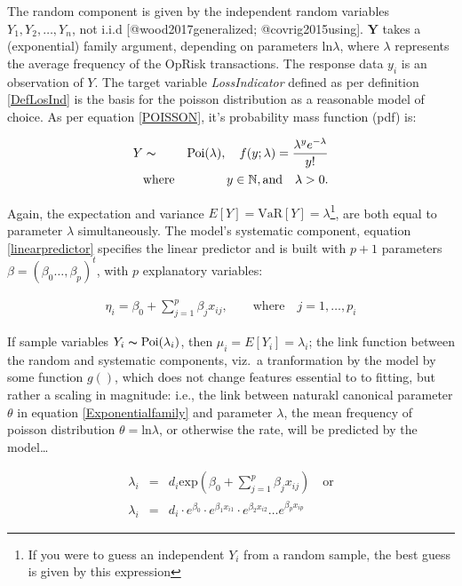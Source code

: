 \documentclass[]{article}
\let\rmarkdownfootnote\footnote%
\def\footnote{\protect\rmarkdownfootnote}
\begin{document}
The random component is given by the independent random variables
\(Y_1, Y_2,\ldots, Y_n\), not i.i.d {[}@wood2017generalized;
@covrig2015using{]}. \(\mathbf{Y}\) takes a (exponential) family
argument, depending on parameters \(\mbox{ln}\lambda\), where
\(\lambda\) represents the average frequency of the OpRisk transactions.
The response data \(y_i\) is an observation of \(Y\). The target
variable \emph{LossIndicator} defined as per definition \ref{DefLosInd}
is the basis for the poisson distribution as a reasonable model of
choice. As per equation \ref{POISSON}, it's probability mass function
(pdf) is:

\singlespacing

\begin{eqnarray}\label{eqn:Poisson}
Y &\thicksim & \mbox{Poi}(\lambda), \quad f(y;\lambda) = \frac{\lambda^y e^{-\lambda}}{y!}\\
 &\mbox{where}& \quad y \in  \mathbb{N}, \mbox{and} \quad \lambda > 0. \nonumber
\end{eqnarray} \doublespacing

Again, the expectation and variance
\(E[Y] = \mbox{VaR}[Y] = \lambda\)\footnote{If you were to guess an independent $Y_i$ from a random sample, the best guess is given by this expression},
are both equal to parameter \(\lambda\) simultaneously. The model's
systematic component, equation \ref{linearpredictor} specifies the
linear predictor and is built with \(p + 1\) parameters
\(\beta = (\beta_0\ldots,\beta_p)^t\), with \(p\) explanatory variables:

\singlespacing

\begin{eqnarray}
\eta_i = \beta_0 + \sum_{j=1}^{p}\beta_jx_{ij}, \qquad \mbox{where} \quad j = 1,\ldots,p_i
\end{eqnarray} \doublespacing

If sample variables \(Y_i \thicksim \mbox{Poi}(\lambda_i)\), then
\(\mu_i = E[Y_i] = \lambda_i\); the link function between the random and
systematic components, viz.~a tranformation by the model by some
function \(g()\), which does not change features essential to to
fitting, but rather a scaling in magnitude: i.e., the link between
naturakl canonical parameter \(\theta\) in equation
\ref{Exponentialfamily} and parameter \(\lambda\), the mean frequency of
poisson distribution \(\theta = \mbox{ln}\lambda\), or otherwise the
rate, will be predicted by the model\ldots

\singlespacing

\begin{eqnarray}\label{eqn:multmodel}
\lambda_i &=& d_i\mbox{exp}(\beta_0 + \sum_{j=1}^{p}\beta_jx_{ij}) \quad \mbox{or} \nonumber \\
\lambda_i &=& d_i\cdot e^{\beta_0}\cdot e^{\beta_1x_{i1}}\cdot e^{\beta_2x_{i2}} \ldots e^{\beta_px_{ip}}
\end{eqnarray} \doublespacing
\end{document}

